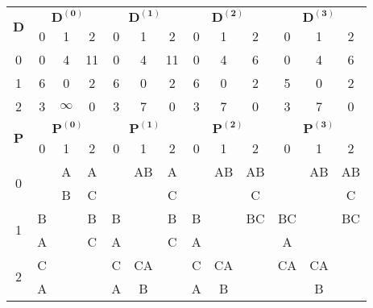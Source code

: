 \begin{center}
\label{tab:floyd}
\begin{tabular}{|c|ccc|ccc|ccc|ccc|}
\hline
\multirow{2}{*}{$\mathbf{D}$} & \multicolumn{3}{|c|}{$\mathbf{D^{(0)}}$} & \multicolumn{3}{|c|}{$\mathbf{D^{(1)}}$} & \multicolumn{3}{|c|}{$\mathbf{D^{(2)}}$} & \multicolumn{3}{|c|}{$\mathbf{D^{(3)}}$} \\
 & 0 & 1 & 2 & 0 & 1 & 2 & 0 & 1 & 2 & 0 & 1 & 2 \\
\hline
0 & 0 & 4 & 11 & 0 & 4 & 11 & 0 & 4 & 6 & 0 & 4 & 6 \\
1 & 6 & 0 & 2 & 6 & 0 & 2 & 6 & 0 & 2 & 5 & 0 & 2 \\
2 & 3 & $\infty$ & 0 & 3 & 7 & 0 & 3 & 7 & 0 & 3 & 7 & 0 \\
\hline
\multirow{2}{*}{$\mathbf{P}$} & \multicolumn{3}{|c|}{$\mathbf{P^{(0)}}$} & \multicolumn{3}{|c|}{$\mathbf{P^{(1)}}$} & \multicolumn{3}{|c|}{$\mathbf{P^{(2)}}$} & \multicolumn{3}{|c|}{$\mathbf{P^{(3)}}$} \\
 & 0 & 1 & 2 & 0 & 1 & 2 & 0 & 1 & 2 & 0 & 1 & 2 \\
\hline
\multirow{2}{*}{0} & & A & A & & AB & A & & AB & AB & & AB & AB \\
                   & & B & C & & & C & & & C & & & C \\
\hline
\multirow{2}{*}{1} & B & & B & B & & B & B & & BC & BC & & BC \\
                   & A & & C & A & & C & A & & & A & & \\
\hline
\multirow{2}{*}{2} & C & & & C & CA & & C & CA & & CA & CA & \\
                   & A & & & A & B & & A & B & & & B & \\
\hline
\end{tabular}
\end{center}

